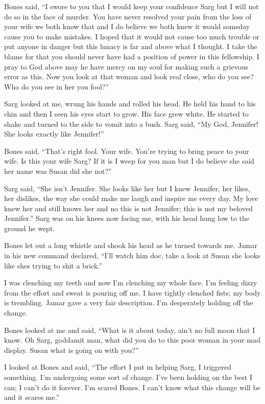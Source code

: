 Bones said, ``I swore to you that I would keep your confidence Sarg but I will not do so in the face of murder. You have never resolved your pain from the loss of your wife we both know that and I do believe we both knew it would someday cause you to make mistakes. I hoped that it would not cause too much trouble or put anyone in danger but this lunacy is far and above what I thought. I take the blame for that you should never have had a position of power in this fellowship. I pray to God above may he have mercy on my soul for making such a grievous error as this. Now you look at that woman and look real close, who do you see? Who do you see in her you fool?''

Sarg looked at me, wrung his hands and rolled his head. He held his hand to his chin and then I seen his eyes start to grow. His face grew white. He started to shake and turned to the side to vomit into a bush. Sarg said, ``My God, Jennifer! She looks exactly like Jennifer!''

Bones said, ``That's right fool. Your wife. You're trying to bring peace to your wife. Is this your wife Sarg? If it is I weep for you man but I do believe she said her name was Susan did she not?''

Sarg said, ``She isn't Jennifer. She looks like her but I knew Jennifer, her likes, her dislikes, the way she could make me laugh and inspire me every day. My love knew her and still knows her and no this is not Jennifer; this is not my beloved Jennifer.'' Sarg was on his knees now facing me, with his head hung low to the ground he wept.

Bones let out a long whistle and shook his head as he turned towards me. Jamar in his new command declared, ``I'll watch him doc, take a look at Susan she looks like shes trying to shit a brick.''

I was clenching my teeth and now I'm clenching my whole face. I'm feeling dizzy from the effort and sweat is pouring off me. I have tightly clenched fists; my body is trembling. Jamar gave a very fair description. I'm desperately holding off the change.

Bones looked at me and said, ``What is it about today, ain't no full moon that I know. Oh Sarg, goddamit man, what did you do to this poor woman in your mad display. Susan what is going on with you?''

I looked at Bones and said, ``The effort I put in helping Sarg, I triggered something. I'm undergoing some sort of change. I've been holding on the best I can; I can't do it forever. I'm scared Bones. I can't know what this change will be and it scares me.''

